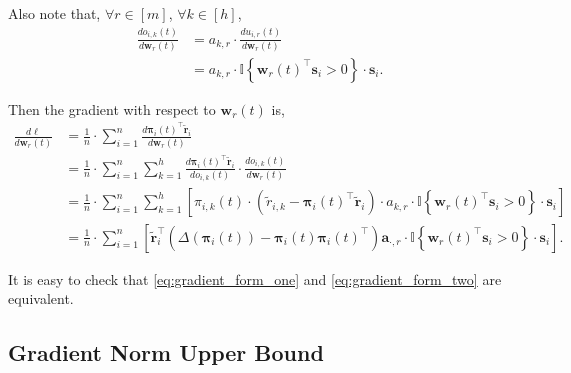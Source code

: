 \documentclass[10pt]{article}
\def\rva{{\mathbf{a}}}
\def\rvs{{\mathbf{s}}}
\def\rvw{{\mathbf{w}}}
\def\rvtilder{{\tilde{\mathbf{r}}}}
\def\rvpi{{\boldsymbol{\pi}}}
\def\sI{{\mathbb{I}}}
\begin{document}
\noindent Also note that, $\forall r \in [m]$, $\forall k \in [h]$,
\begin{equation*}
\begin{split}
    \frac{d o_{i,k}(t)}{d \rvw_r(t)} &= a_{k,r} \cdot \frac{d u_{i,r}(t)}{d \rvw_r(t)} \\
    &= a_{k,r} \cdot \sI\left\{ \rvw_r(t)^\top \rvs_i > 0 \right\} \cdot \rvs_i.
\end{split}
\end{equation*}

\noindent Then the gradient with respect to $\rvw_r(t)$ is,
\begin{equation}
\label{eq:gradient_form_two}
\begin{split}
    \frac{d\ell}{d \rvw_r(t)} &= \frac{1}{n} \cdot \sum\limits_{i=1}^{n}{ \frac{d \rvpi_i(t)^\top \rvtilder_i}{d \rvw_r(t)} } \\
    &= \frac{1}{n} \cdot \sum\limits_{i=1}^{n}{ \sum\limits_{k=1}^{h}{ \frac{d \rvpi_i(t)^\top \rvtilder_i}{d o_{i,k}(t)}\cdot \frac{d o_{i,k}(t)}{d \rvw_r(t)} } } \\
    &= \frac{1}{n} \cdot \sum\limits_{i=1}^{n}{ \sum\limits_{k=1}^{h}{ \left[ \pi_{i,k}(t) \cdot \left( \tilde{r}_{i, k} - \rvpi_i(t)^\top \rvtilder_i \right) \cdot a_{k,r} \cdot \sI\left\{ \rvw_r(t)^\top \rvs_i > 0 \right\} \cdot \rvs_i  \right] }  } \\
    &= \frac{1}{n} \cdot \sum\limits_{i=1}^{n}{ \left[ \rvtilder_i^\top \left( \Delta\left( \rvpi_i(t) \right) - \rvpi_i(t) \rvpi_i(t)^\top \right) \rva_{\cdot, r} \cdot \sI\left\{ \rvw_r(t)^\top \rvs_i > 0 \right\} \cdot \rvs_i  \right] }.
\end{split}
\end{equation}

\noindent It is easy to check that \cref{eq:gradient_form_one} and \cref{eq:gradient_form_two} are equivalent.

\subsection{Gradient Norm Upper Bound}
\end{document}
